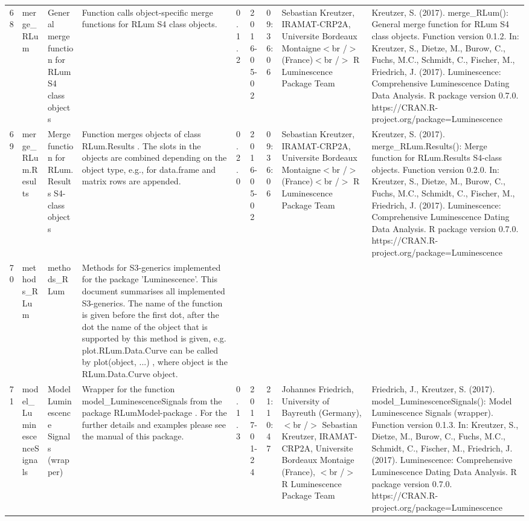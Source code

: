 \begin{table}[ht]
\begin{tabular}{rllllllll}
 \\ 
  68 & merge\_RLum & General merge function for RLum S4 class objects & Function calls object-specific merge functions for RLum S4 class objects. & 0.1.2 & 2016-05-02 & 09:36:06
 & Sebastian Kreutzer, IRAMAT-CRP2A, Universite Bordeaux Montaigne$<$br /$>$ (France)$<$br /$>$  R Luminescence Package Team & Kreutzer, S. (2017). merge\_RLum(): General merge function for RLum S4 class objects. Function version 0.1.2. In: Kreutzer, S., Dietze, M., Burow, C., Fuchs, M.C., Schmidt, C., Fischer, M., Friedrich, J. (2017). Luminescence: Comprehensive Luminescence Dating Data Analysis. R package version 0.7.0. https://CRAN.R-project.org/package=Luminescence
 \\ 
  69 & merge\_RLum.Results & Merge function for RLum.Results S4-class objects & Function merges objects of class  RLum.Results . The slots in the objects are combined depending on the object type, e.g., for  data.frame  and  matrix  rows are appended. & 0.2.0 & 2016-05-02 & 09:36:06
 & Sebastian Kreutzer, IRAMAT-CRP2A, Universite Bordeaux Montaigne$<$br /$>$ (France)$<$br /$>$  R Luminescence Package Team & Kreutzer, S. (2017). merge\_RLum.Results(): Merge function for RLum.Results S4-class objects. Function version 0.2.0. In: Kreutzer, S., Dietze, M., Burow, C., Fuchs, M.C., Schmidt, C., Fischer, M., Friedrich, J. (2017). Luminescence: Comprehensive Luminescence Dating Data Analysis. R package version 0.7.0. https://CRAN.R-project.org/package=Luminescence
 \\ 
  70 & methods\_RLum & methods\_RLum & Methods for S3-generics implemented for the package 'Luminescence'. This document summarises all implemented S3-generics. The name of the function is given before the first dot, after the dot the name of the object that is supported by this method is given, e.g.  plot.RLum.Data.Curve  can be called by  plot(object, ...) , where object  is the  RLum.Data.Curve  object. &  &  &  &  &  \\ 
  71 & model\_LuminescenceSignals & Model Luminescence Signals (wrapper) & Wrapper for the function  model\_LuminescenceSignals  from the package RLumModel-package . For the further details and examples please see the manual of this package. & 0.1.3 & 2017-01-24 & 21:10:47
 & Johannes Friedrich, University of Bayreuth (Germany), $<$br /$>$ Sebastian Kreutzer, IRAMAT-CRP2A, Universite Bordeaux Montaige (France),  $<$br /$>$  R Luminescence Package Team & Friedrich, J., Kreutzer, S. (2017). model\_LuminescenceSignals(): Model Luminescence Signals (wrapper). Function version 0.1.3. In: Kreutzer, S., Dietze, M., Burow, C., Fuchs, M.C., Schmidt, C., Fischer, M., Friedrich, J. (2017). Luminescence: Comprehensive Luminescence Dating Data Analysis. R package version 0.7.0. https://CRAN.R-project.org/package=Luminescence

\end{tabular}
\end{table}
